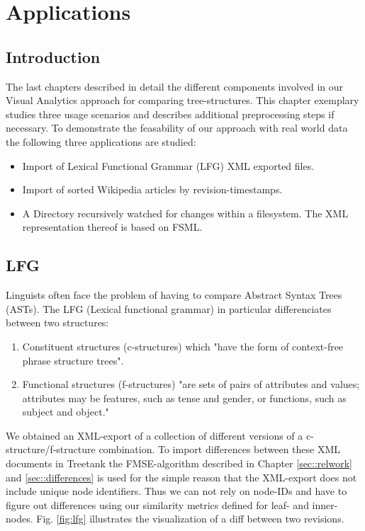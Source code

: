 \section{Applications}\label{sec::applications}
\subsection{Introduction}
The last chapters described in detail the different components involved in our Visual Analytics approach for comparing tree-structures. This chapter exemplary studies three usage scenarios and describes additional preprocessing steps if necessary. To demonstrate the feasability of our approach with real world data the following three applications are studied:

\begin{itemize}
\item Import of Lexical Functional Grammar (LFG) XML exported files.
\item Import of sorted Wikipedia articles by revision-timestamps. 
\item A Directory recursively watched for changes within a filesystem. The XML representation thereof is based on FSML\cite{FSML}. 
\end{itemize}

\subsection{LFG}
Linguists often face the problem of having to compare Abstract Syntax Trees (ASTs). The LFG (Lexical functional grammar) in particular differenciates between two structures:

\begin{enumerate}
\item{Constituent structures (c-structures)} which "have the form of context-free phrase structure trees".
\item{Functional structures (f-structures)} "are sets of pairs of attributes and values; attributes may be features, such as tense and gender, or functions, such as subject and object."\cite{LFG}
\end{enumerate}

We obtained an XML-export of a collection of different versions of a c-structure/f-structure combination. To import differences between these XML documents in Treetank the FMSE-algorithm described in Chapter \ref{sec::relwork} and \ref{sec::differences} is used for the simple reason that the XML-export does not include unique node identifiers. Thus we can not rely on node-IDs and have to figure out differences using our similarity metrics defined for leaf- and inner-nodes. Fig. \ref{fig:lfg} illustrates the visualization of a diff between two revisions.

